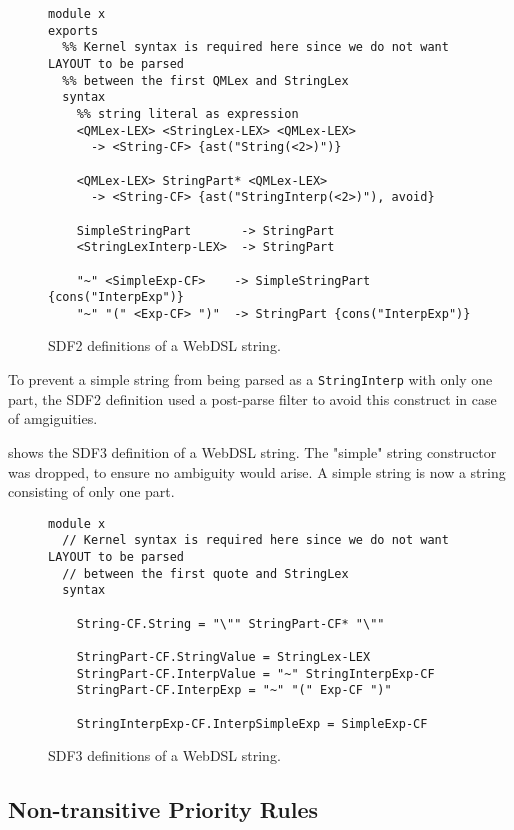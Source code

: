       \begin{figure}
        \begin{verbatim}
module x
exports
  %% Kernel syntax is required here since we do not want LAYOUT to be parsed
  %% between the first QMLex and StringLex
  syntax
    %% string literal as expression
    <QMLex-LEX> <StringLex-LEX> <QMLex-LEX>
      -> <String-CF> {ast("String(<2>)")}

    <QMLex-LEX> StringPart* <QMLex-LEX>
      -> <String-CF> {ast("StringInterp(<2>)"), avoid}

    SimpleStringPart       -> StringPart
    <StringLexInterp-LEX>  -> StringPart

    "~" <SimpleExp-CF>    -> SimpleStringPart {cons("InterpExp")}
    "~" "(" <Exp-CF> ")"  -> StringPart {cons("InterpExp")}
        \end{verbatim}
        \caption{\label{fig:sdf2-webdsl-string}SDF2 definitions of a WebDSL string.}
      \end{figure}

      To prevent a simple string from being parsed as a \texttt{StringInterp} with only one part, the SDF2 definition used a post-parse filter to avoid this construct in case of amgiguities.
      
       shows the SDF3 definition of a WebDSL string. The "simple" string constructor was dropped, to ensure no ambiguity would arise. A simple string is now a string consisting of only one part.

      \begin{figure}
        \begin{verbatim}
module x
  // Kernel syntax is required here since we do not want LAYOUT to be parsed
  // between the first quote and StringLex
  syntax

    String-CF.String = "\"" StringPart-CF* "\""

    StringPart-CF.StringValue = StringLex-LEX
    StringPart-CF.InterpValue = "~" StringInterpExp-CF
    StringPart-CF.InterpExp = "~" "(" Exp-CF ")"

    StringInterpExp-CF.InterpSimpleExp = SimpleExp-CF
        \end{verbatim}
        \caption{\label{fig:sdf3-webdsl-string}SDF3 definitions of a WebDSL string.}
      \end{figure}

    \subsection{Non-transitive Priority Rules}

